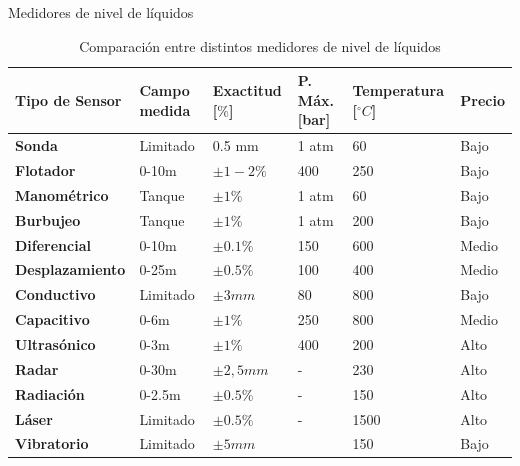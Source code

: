 \documentclass[aspectratio=169]{beamer}
\begin{document}
\begin{frame}{Medidores de nivel de líquidos}
 \begin{table}[]
 \footnotesize
    \centering
    \begin{tabular}{m{3.2cm} m{1.2cm} m{1.2cm} m{1.9cm} m{1.8cm} m{1.6cm}}
        \toprule
        \textbf{Tipo de Sensor} & \textbf{Campo medida} & \textbf{Exactitud [$\%$]} &\textbf{P. Máx. [bar]} & \textbf{Temperatura [$^{\circ}C$]} & \textbf{Precio} \\
        \midrule
        \textbf{Sonda} & Limitado & 0.5 mm & 1 atm & 60 & Bajo\\
        \textbf{Flotador} & 0-10m & $\pm1-2\%$ & 400 & 250 & Bajo\\
        \textbf{Manométrico} & Tanque & $\pm1\%$ & 1 atm & 60 & Bajo\\
        \textbf{Burbujeo} & Tanque & $\pm1\%$ & 1 atm & 200  & Bajo\\
        \textbf{Diferencial} & 0-10m & $\pm0.1\%$ & 150 & 600  & Medio\\
        \textbf{Desplazamiento} & 0-25m & $\pm0.5\%$ & 100 & 400 & Medio\\
        \textbf{Conductivo} & Limitado & $\pm 3 mm$ & 80 & 800 & Bajo\\
        \textbf{Capacitivo} & 0-6m & $\pm 1\%$ & 250 & 800 & Medio\\
        \textbf{Ultrasónico} & 0-3m & $\pm 1\%$ & 400 & 200 & Alto\\
        \textbf{Radar} & 0-30m & $\pm 2,5 mm$ & - & 230 & Alto\\
        \textbf{Radiación} & 0-2.5m & $\pm0.5\%$ & - & 150 & Alto\\
        \textbf{Láser} & Limitado & $\pm0.5\%$ &    -& 1500 & Alto\\
        \textbf{Vibratorio} & Limitado & $\pm 5 mm$ &  & 150 & Bajo\\
        \bottomrule
    \end{tabular}
    \tiny{\caption{Comparación entre distintos medidores de nivel de líquidos} \cite{sole2005instrumentacion}}
    \label{tab:Comparacion_sensores}
\end{table}
\end{frame}
\end{document}
